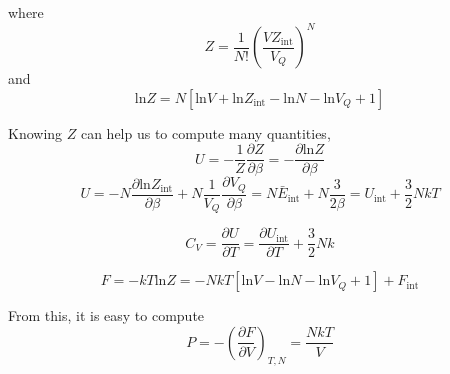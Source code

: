 where
\begin{equation}
Z = \frac{1}{N!} (\frac{VZ_\text{int}}{V_Q})^N
\end{equation}
and
\begin{equation}
\text{ln}Z = N[\text{ln}V + \text{ln}Z_\text{int} - \text{ln}N - \text{ln}V_Q + 1]
\end{equation}


Knowing $Z$ can help us to compute many quantities,
\begin{equation}
U = -\frac{1}{Z}\frac{\partial Z}{\partial{\beta}} = -\frac{\partial \text{ln}Z}{\partial{\beta}} 
\end{equation}
\begin{equation}
U = -N\frac{\partial \text{ln}Z_\text{int}}{\partial{\beta}} + N\frac{1}{V_Q}\frac{\partial{V_Q}}{\partial{\beta}}
  = N\bar{E}_\text{int} + N\frac{3}{2\beta} = U_\text{int} + \frac{3}{2}NkT
\end{equation}

\begin{equation}
C_V = \frac{\partial U}{\partial T} =  \frac{\partial{U_\text{int}}}{\partial{T}} + \frac{3}{2}Nk
\end{equation}

\begin{equation}
F = -kT\text{ln}Z = -NkT[\text{ln}V - \text{ln}N - \text{ln}V_Q + 1] + F_\text{int}
\end{equation}

From this, it is easy to compute 
\begin{equation}
P = -(\frac{\partial F}{\partial V})_{T,N}  = \frac{NkT}{V}
\end{equation}


